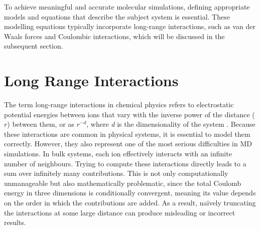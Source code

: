 To achieve meaningful and accurate molecular simulations, defining appropriate models and equations that describe the subject system is essential. These modelling equations typically incorporate long-range interactions, such as van der Waals forces and Coulombic interactions, which will be discussed in the subsequent section.


\section{Long Range Interactions}
The term long-range interactions in chemical physics refers to electrostatic potential energies between ions that vary with the inverse power of the distance ($r$) between them, or as $r^{-d}$, where \textit{d} is the dimensionality of the system \cite{simulation_of_liq}. Because these interactions are common in physical systems, it is essential to model them correctly. However, they also represent one of the most serious difficulties in \ac{MD} simulations. In bulk systems, each ion effectively interacts with an infinite number of neighbours. Trying to compute these interactions directly leads to a sum over infinitely many contributions. This is not only computationally unmanageable but also mathematically problematic, since the total Coulomb energy in three dimensions is conditionally convergent, meaning its value depends on the order in which the contributions are added. As a result, naïvely truncating the interactions at some large distance can produce misleading or incorrect results.

